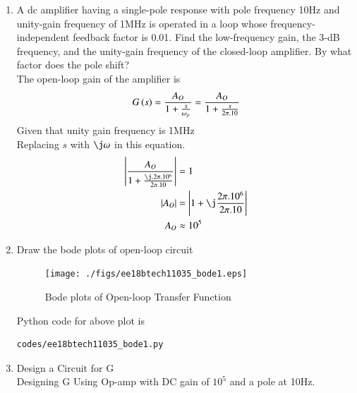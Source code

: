 \begin{enumerate}[label=\thesubsection.\arabic*.,ref=\thesubsection.\theenumi]

\item A dc amplifier having a single-pole response with pole frequency 10Hz and unity-gain frequency of 1MHz is operated in a loop whose frequency-independent feedback factor is 0.01. Find the low-frequency gain, the 3-dB frequency, and the unity-gain frequency of the closed-loop amplifier. By what factor does the pole shift?\\
\solution The open-loop gain of the amplifier is
\begin{align}
    G\left(s\right)=\frac{A_{O}}{1+\frac{s}{\omega_p}}=\frac{A_{O}}{1+\frac{s}{2\pi.10}}
\end{align}
Given that unity gain frequency is 1MHz\\
Replacing $s$ with $\j\omega$ in this equation.
\begin{align}
    \abs{\frac{A_{O}}{1+\frac{\j.2\pi.10^6}{2\pi.10}}}&=1\\
    \abs{A_{O}}&=\abs{1+\j\frac{2\pi.10^6}{2\pi.10}}\\
    A_{O}&\approx10^5
\end{align}

\item Draw the bode plots of open-loop circuit\\
\solution
\begin{figure}[!h]
  \texttt{[image: ./figs/ee18btech11035\_bode1.eps]}
  \caption{Bode plots of Open-loop Transfer Function}
  \label{fig:ee18btech11035_bode1}
\end{figure}

Python code for above plot is
\begin{lstlisting}
codes/ee18btech11035_bode1.py
\end{lstlisting}

\item Design a Circuit for G\\
\solution Designing G Using Op-amp with DC gain of $10^5$ and a pole at 10Hz.

\begin{figure}[!ht]
    \begin{center}
		\resizebox{\columnwidth}{!}{}
	\end{center}
\caption{}
\label{fig:ee18btech11035_G}
\end{figure}




\end{enumerate}
